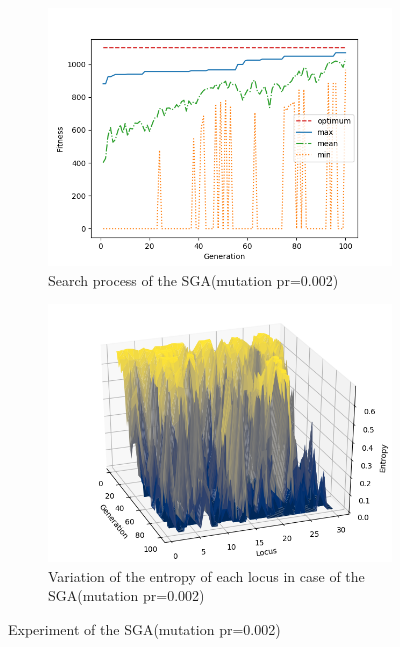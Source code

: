 \documentclass[onecolumn]{ujarticle}   %
\begin{document}
	\begin{figure}[h]
		\begin{subfigure}{0.49\columnwidth}
			\includegraphics[width=1.0\columnwidth]{figure/knapsackSGA_stats_mut_0002_Np_64.png}
			\caption{Search process of the SGA(mutation pr=0.002)}
			\label{fig:searchprocessSGApr0002}
		\end{subfigure}
		\begin{subfigure}{0.49\columnwidth}
			\includegraphics[width=1.0\columnwidth]{figure/knapsackSGA_mut_0002_Np_64.png}
			\caption{Variation of the entropy of each locus in case of the SGA(mutation pr=0.002)}
			\label{fig:entropySGApr0002}
		\end{subfigure}
		\caption{Experiment of the SGA(mutation pr=0.002)}
	\end{figure}
\end{document}

